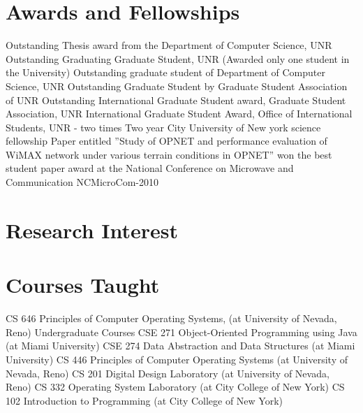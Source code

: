 \documentclass[11pt,letterpaper,sans]{moderncv}   %
\begin{document}
\section{Awards and Fellowships}
	{Outstanding Thesis award from the Department of Computer Science, UNR
}
	{Outstanding Graduating Graduate Student, UNR (Awarded only one student in the University)
}
	{Outstanding graduate student of Department of Computer Science, UNR
}
	{Outstanding Graduate Student by Graduate Student Association of UNR
}
	{Outstanding International Graduate Student award, Graduate Student Association, UNR
}
	{International Graduate Student Award, Office of International Students, UNR - two times
}
	{Two year City University of New york science fellowship
}
	{Paper entitled ”Study of OPNET and performance evaluation of WiMAX network under various terrain conditions in OPNET” won the best student paper award at the National
Conference on Microwave and Communication NCMicroCom-2010
}


\section{Research Interest}





\section{Courses Taught }

CS 646	Principles of Computer Operating Systems, (at University of Nevada, Reno)
Undergraduate Courses
CSE 271	Object-Oriented Programming using Java (at Miami University)
CSE 274	Data Abstraction and Data Structures (at Miami University)
CS 446	Principles of Computer Operating Systems (at University of Nevada, Reno)
CS 201	Digital Design Laboratory (at University of Nevada, Reno)
CS 332	Operating System Laboratory (at City College of New York)
CS 102 Introduction to Programming (at City College of New York)
\end{document}
